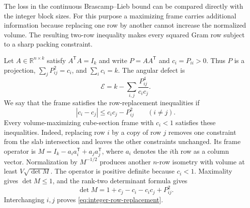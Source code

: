 \documentclass[11pt,a4paper]{article}
\theoremstyle{remark}\newtheorem{remark}[theorem]{Remark}
\numberwithin{equation}{section}
\begin{document}
The loss in the continuous Brascamp--Lieb bound can be compared directly
with the integer block sizes.  For this purpose a maximizing frame carries
additional information because replacing one row by another cannot
increase the normalized volume.  The resulting two-row
inequality makes every squared Gram row subject to a sharp packing
constraint.

Let $A\in\mathbb R^{n\times k}$ satisfy $A^{\mathsf T}A=I_k$ and write
$P=AA^{\mathsf T}$ and $c_i=P_{ii}>0$.  Thus $P$ is a projection,
$\sum_jP_{ij}^2=c_i$, and $\sum_i c_i=k$.  The angular defect is
\[
 \mathcal E=k-\sum_{i,j}\frac{P_{ij}^4}{c_i c_j}.
\]
We say that the frame satisfies the row-replacement inequalities if
\begin{equation}\label{eq:integer-row-replacement}
 |c_i-c_j|\le c_i c_j-P_{ij}^2\qquad(i\ne j).
\end{equation}
Every volume-maximizing cube-section frame with $c_i<1$ satisfies
these inequalities.  Indeed, replacing row $i$ by a copy of row $j$
removes one constraint from the slab intersection and leaves the other
constraints unchanged.  Its frame operator is
$M=I_k-a_i a_i^{\mathsf T}+a_j a_j^{\mathsf T}$, where $a_i$ denotes
the $i$th row as a column vector.  Normalization by $M^{-1/2}$ produces
another $n$-row isometry with volume at least $V\sqrt{\det M}$.
The operator is positive definite because $c_i<1$.  Maximality gives
$\det M\le1$, and the rank-two determinant formula gives
\[
 \det M=1+c_j-c_i-c_i c_j+P_{ij}^2.
\]
Interchanging $i,j$ proves \eqref{eq:integer-row-replacement}.
\end{document}
